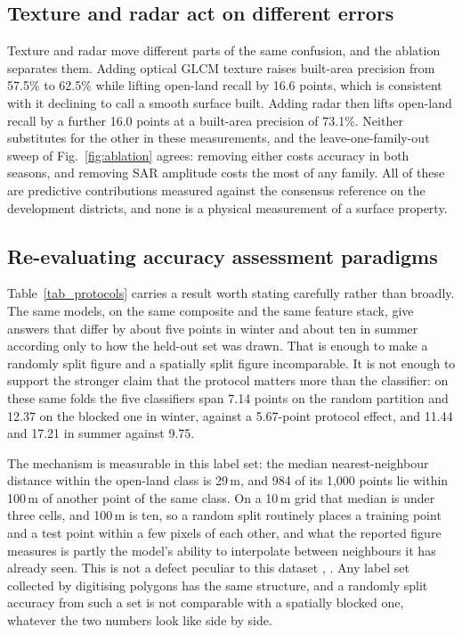 \documentclass[conference]{IEEEtran}
\begin{document}
\subsection{Texture and radar act on different errors}
Texture and radar move different parts of the same confusion, and the ablation separates them. Adding optical GLCM texture raises built-area precision from 57.5\% to 62.5\% while lifting open-land recall by 16.6 points, which is consistent with it declining to call a smooth surface built. Adding radar then lifts open-land recall by a further 16.0 points at a built-area precision of 73.1\%. Neither substitutes for the other in these measurements, and the leave-one-family-out sweep of Fig.~\ref{fig:ablation} agrees: removing either costs accuracy in both seasons, and removing SAR amplitude costs the most of any family. All of these are predictive contributions measured against the consensus reference on the development districts, and none is a physical measurement of a surface property. 

\subsection{Re-evaluating accuracy assessment paradigms}
\label{sec:protocols}
Table~\ref{tab_protocols} carries a result worth stating carefully rather than broadly. The same models, on the same composite and the same feature stack, give answers that differ by about five points in winter and about ten in summer according only to how the held-out set was drawn. That is enough to make a randomly split figure and a spatially split figure incomparable. It is not enough to support the stronger claim that the protocol matters more than the classifier: on these same folds the five classifiers span 7.14 points on the random partition and 12.37 on the blocked one in winter, against a 5.67-point protocol effect, and 11.44 and 17.21 in summer against 9.75.

The mechanism is measurable in this label set: the median nearest-neighbour distance within the open-land class is 29\,m, and 984 of its 1,000 points lie within 100\,m of another point of the same class. On a 10\,m grid that median is under three cells, and 100\,m is ten, so a random split routinely places a training point and a test point within a few pixels of each other, and what the reported figure measures is partly the model's ability to interpolate between neighbours it has already seen. This is not a defect peculiar to this dataset \cite{r18}, \cite{r19}. Any label set collected by digitising polygons has the same structure, and a randomly split accuracy from such a set is not comparable with a spatially blocked one, whatever the two numbers look like side by side.
\end{document}
